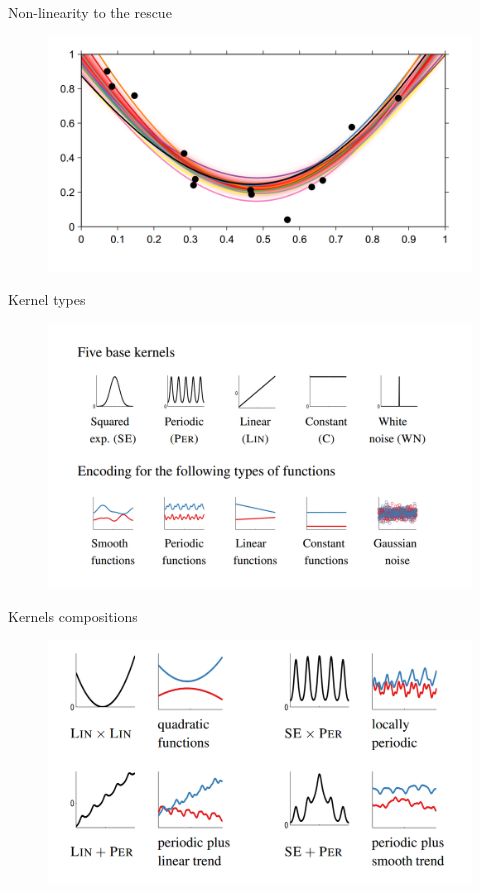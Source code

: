 \documentclass[12pt]{beamer}
\begin{document}
\begin{frame}{Non-linearity to the rescue}
\begin{figure}
\includegraphics[scale=0.4]{Bayesian_non_linear_20.png} 
\end{figure}
\end{frame}

\begin{frame}{Kernel types}
\begin{figure}
\includegraphics[scale=0.3]{Kernels_list.png} 
\end{figure}
\end{frame}

\begin{frame}{Kernels compositions}
\begin{figure}
\includegraphics[scale=0.3]{Kernels_composition.png} 
\end{figure}
\end{frame}
\end{document}
